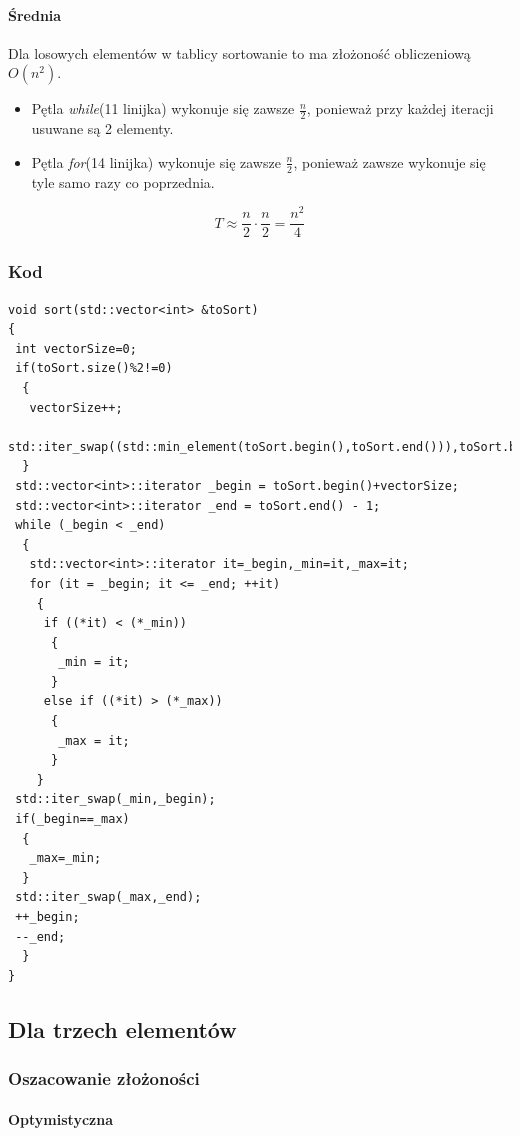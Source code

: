 \paragraph{Średnia}
Dla losowych elementów w tablicy sortowanie to ma złożoność obliczeniową $O(n^2)$.
\begin{itemize}
\item Pętla \textit{while}(11 linijka) wykonuje się zawsze $\frac{n}{2}$, ponieważ przy każdej iteracji usuwane są 2 elementy.
\item Pętla \textit{for}(14 linijka) wykonuje się zawsze $\frac{n}{2}$, ponieważ zawsze wykonuje się tyle samo razy co poprzednia.
\end{itemize}

\begin{equation*}
T \approx \frac{n}{2} \cdot \frac{n}{2} = \frac{n^2}{4}
\end{equation*}
\wyjT


\subsubsection{Kod}
\begin{lstlisting}[caption={Sortowanie przez wybieranie dla par},label={lst:wybieranie}]
void sort(std::vector<int> &toSort)
{
 int vectorSize=0;
 if(toSort.size()%2!=0)
  {
   vectorSize++;
   std::iter_swap((std::min_element(toSort.begin(),toSort.end())),toSort.begin());
  }
 std::vector<int>::iterator _begin = toSort.begin()+vectorSize;
 std::vector<int>::iterator _end = toSort.end() - 1;
 while (_begin < _end)
  {
   std::vector<int>::iterator it=_begin,_min=it,_max=it;
   for (it = _begin; it <= _end; ++it)
    {
     if ((*it) < (*_min))
      {
       _min = it;
      }
     else if ((*it) > (*_max))
      {
       _max = it;
      }
    }
 std::iter_swap(_min,_begin);
 if(_begin==_max)
  {
   _max=_min;
  }
 std::iter_swap(_max,_end);
 ++_begin;
 --_end;
  }
}
\end{lstlisting}
\subsection{Dla trzech elementów}

\subsubsection{Oszacowanie złożoności}
\paragraph{Optymistyczna}

